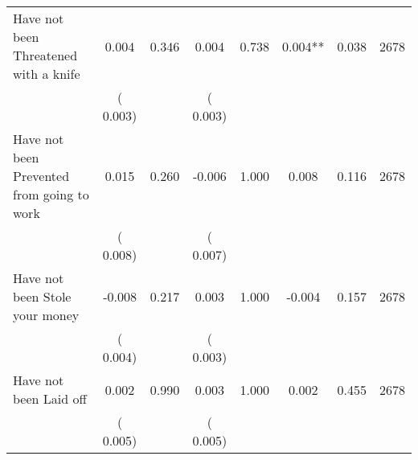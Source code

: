 \begin{tabular}{l*{7}{c}}
 Have not been Threatened with a knife       &              0.004       &        0.346  &              0.004       &        0.738  &              0.004**       &              0.038 &  2678 \\ 
                       &       (       0.003)             &                               &       (       0.003)                     &                               &                                               &                                &                      \\ 

 Have not been Prevented from going to work       &              0.015       &        0.260  &             -0.006       &        1.000  &              0.008       &              0.116 &  2678 \\ 
                       &       (       0.008)             &                               &       (       0.007)                     &                               &                                               &                                &                      \\ 

 Have not been Stole your money       &             -0.008       &        0.217  &              0.003       &        1.000  &             -0.004       &              0.157 &  2678 \\ 
                       &       (       0.004)             &                               &       (       0.003)                     &                               &                                               &                                &                      \\ 

 Have not been Laid off       &              0.002       &        0.990  &              0.003       &        1.000  &              0.002       &              0.455 &  2678 \\ 
                       &       (       0.005)             &                               &       (       0.005)                     &                               &                                               &                                &                      \\ 

\hline \end{tabular}